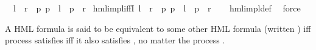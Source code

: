 \begin{isabellebody}
\ \ {\isachardoublequoteopen}{\isasymphi}l\ {\isasymRrightarrow}\ {\isasymphi}r\ {\isasymequiv}\ {\isacharparenleft}{\kern0pt}{\isasymforall}p{\isachardot}{\kern0pt}\ {\isacharparenleft}{\kern0pt}p\ {\isasymTurnstile}\ {\isasymphi}l{\isacharparenright}{\kern0pt}\ {\isasymlongrightarrow}\ {\isacharparenleft}{\kern0pt}p\ {\isasymTurnstile}\ {\isasymphi}r{\isacharparenright}{\kern0pt}{\isacharparenright}{\kern0pt}{\isachardoublequoteclose}\isanewline
\isanewline
{}\isamarkupfalse%
\ hml{\isacharunderscore}{\kern0pt}impl{\isacharunderscore}{\kern0pt}iffI{\isacharcolon}{\kern0pt}\ {\isachardoublequoteopen}{\isasymphi}l\ {\isasymRrightarrow}\ {\isasymphi}r\ {\isacharequal}{\kern0pt}\ {\isacharparenleft}{\kern0pt}{\isasymforall}p{\isachardot}{\kern0pt}\ {\isacharparenleft}{\kern0pt}p\ {\isasymTurnstile}\ {\isasymphi}l{\isacharparenright}{\kern0pt}\ {\isasymlongrightarrow}\ {\isacharparenleft}{\kern0pt}p\ {\isasymTurnstile}\ {\isasymphi}r{\isacharparenright}{\kern0pt}{\isacharparenright}{\kern0pt}{\isachardoublequoteclose}\isanewline
%
\isadelimproof
\ \ %
\endisadelimproof
%
\isatagproof
{}\isamarkupfalse%
\ hml{\isacharunderscore}{\kern0pt}impl{\isacharunderscore}{\kern0pt}def\ \isamarkupfalse%
\ force%
\endisatagproof
{\isafoldproof}%
%
\isadelimproof
%
\endisadelimproof
%
\isadelimdocument
%
\endisadelimdocument
%
\isatagdocument
%
\isamarkuptrue%
%
\endisatagdocument
{\isafolddocument}%
%
\isadelimdocument
%
\endisadelimdocument
%
\begin{isamarkuptext}%
A HML formula  is said to be equivalent to some other HML formula  (written )
iff process  satisfies  iff it also satisfies , no matter the process .


\end{isamarkuptext}
\end{isabellebody}
